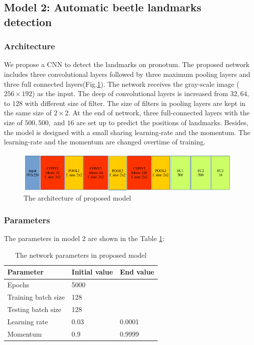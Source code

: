 \documentclass[12pt,a4paper]{article}
\begin{document}
\subsection{Model 2: Automatic beetle landmarks detection}
\subsubsection{Architecture}
We propose a CNN to detect the landmarks on pronotum. The proposed network includes three convolutional layers followed by three maximum pooling layers and three full connected layers(Fig.\ref{pmodel}). The network receives the gray-scale image ($256 \times 192$) as the input. The deep of convolutional layers is increased from $32, 64, $ to $ 128$ with different size of filter. The size of filters in pooling layers are kept in the same size of $2 \times 2$. At the end of network, three full-connected layers with the size of $500, 500, $ and $16$ are set up to predict the positions of landmarks. Besides, the model is designed with a small sharing learning-rate and the momentum. The learning-rate and the momentum are changed overtime of training.
\begin{figure}[h!]
	\centering
	\includegraphics[scale=0.45]{images/model3}
	\caption{The architecture of proposed model}
	\label{pmodel}
\end{figure}
\subsubsection{Parameters}
The parameters in model 2 are shown in the Table \ref{model2parameters}:
\begin{table}[h!]
	\centering
	\begin{tabular}{l l l}
	Parameter & Initial value & End value \\ \hline
	Epochs & 5000 &  \\ \hline
	Training batch size & 128 & \\ \hline
	Testing batch size & 128 & \\ \hline
	Learning rate & 0.03 & 0.0001 \\ \hline
	Momentum & 0.9 & 0.9999 \\ \hline
	\end{tabular}
	\caption{The network parameters in proposed model}
	\label{model2parameters}
\end{table}
\end{document}
